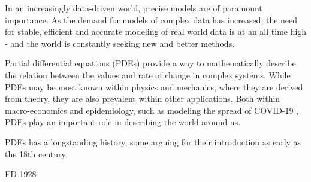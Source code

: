 In an increasingly data-driven world, precise models are of paramount importance.
As the demand for models of complex data has increased, the need for stable, efficient and accurate modeling of real world data is at an all time high - and the world is constantly seeking new and better methods.

Partial differential equations (PDEs) provide a way to mathematically describe the relation between the values and rate of change in complex systems.
While PDEs may be most known within physics and mechanics, where they are derived from theory, they are also prevalent within other applications.
Both within macro-economics \cite{ecoPDE} and epidemiology, such as modeling the spread of COVID-19 \cite{covidus}, PDEs play an important role in describing the world around us. 

PDEs has a longstanding history, some arguing for their introduction as early as the 18th century \cite{}

FD 1928 





